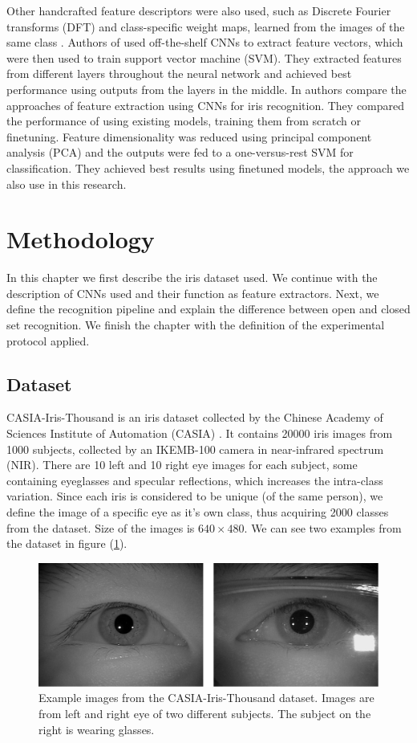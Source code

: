 \documentclass[9pt]{IEEEtran}
\begin{document}
Other handcrafted feature descriptors were also used, such as Discrete Fourier transforms (DFT) \cite{miyazawa2008effective} and class-specific weight maps, learned from the images of the same class \cite{dong2010iris}. Authors of \cite{nguyen2017iris} used off-the-shelf CNNs to extract feature vectors, which were then used to train support vector machine (SVM). They extracted features from different layers throughout the neural network and achieved best performance using outputs from the layers in the middle. In \cite{boyd2020deep} authors compare the approaches of feature extraction using CNNs for iris recognition. They compared the performance of using existing models, training them from scratch or finetuning. Feature dimensionality was reduced using principal component analysis (PCA) and the outputs were fed to a one-versus-rest SVM for classification. They achieved best results using finetuned models, the approach we also use in this research.


\section{Methodology}
In this chapter we first describe the iris dataset used. We continue with the description of CNNs used and their function as feature extractors. Next, we define the recognition pipeline and explain the difference between open and closed set recognition. We finish the chapter with the definition of the experimental protocol applied.

\subsection{Dataset}
CASIA-Iris-Thousand is an iris dataset collected by the Chinese Academy of Sciences Institute of Automation (CASIA) \cite{casia-iris-thousand}. It contains 20000 iris images from 1000 subjects, collected by an IKEMB-100 camera in near-infrared spectrum (NIR). There are 10 left and 10 right eye images for each subject, some containing eyeglasses and specular reflections, which increases the intra-class variation. Since each iris is considered to be unique (of the same person), we define the image of a specific eye as it's own class, thus acquiring 2000 classes from the dataset. Size of the images is $640\times480$. We can see two examples from the dataset in figure (\ref{fig:casia-example}).
\begin{figure}[h]
    \centering
    \includegraphics[width=1\columnwidth]{figures/casia-iris-thousand-example.png}
    \caption{Example images from the CASIA-Iris-Thousand dataset. Images are from left and right eye of two different subjects. The subject on the right is wearing glasses.}
    \label{fig:casia-example}
\end{figure}
\end{document}
